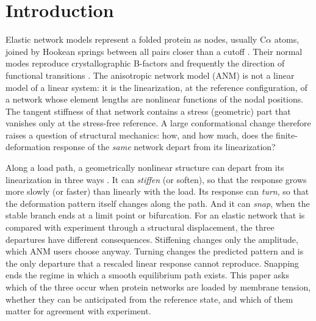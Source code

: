 \documentclass[preprint,12pt,a4paper]{elsarticle}
\begin{document}
\section{Introduction}
Elastic network models represent a folded protein as nodes, usually C$\alpha$ atoms, joined by Hookean springs between all pairs closer than a cutoff \citep{tirion1996,atilgan2001,eyal2006,yang2009}. Their normal modes reproduce crystallographic B-factors and frequently the direction of functional transitions \citep{togashi2018,valadie2003}. The anisotropic network model (ANM) is not a linear model of a linear system: it is the linearization, at the reference configuration, of a network whose element lengths are nonlinear functions of the nodal positions. The tangent stiffness of that network contains a stress (geometric) part that vanishes only at the stress-free reference. A large conformational change therefore raises a question of structural mechanics: how, and how much, does the finite-deformation response of the \emph{same} network depart from its linearization?

Along a load path, a geometrically nonlinear structure can depart from its linearization in three ways \citep{thompson1973}. It can \emph{stiffen} (or soften), so that the response grows more slowly (or faster) than linearly with the load. Its response can \emph{turn}, so that the deformation pattern itself changes along the path. And it can \emph{snap}, when the stable branch ends at a limit point or bifurcation. For an elastic network that is compared with experiment through a structural displacement, the three departures have different consequences. Stiffening changes only the amplitude, which ANM users choose anyway. Turning changes the predicted pattern and is the only departure that a rescaled linear response cannot reproduce. Snapping ends the regime in which a smooth equilibrium path exists. This paper asks which of the three occur when protein networks are loaded by membrane tension, whether they can be anticipated from the reference state, and which of them matter for agreement with experiment.
\end{document}
